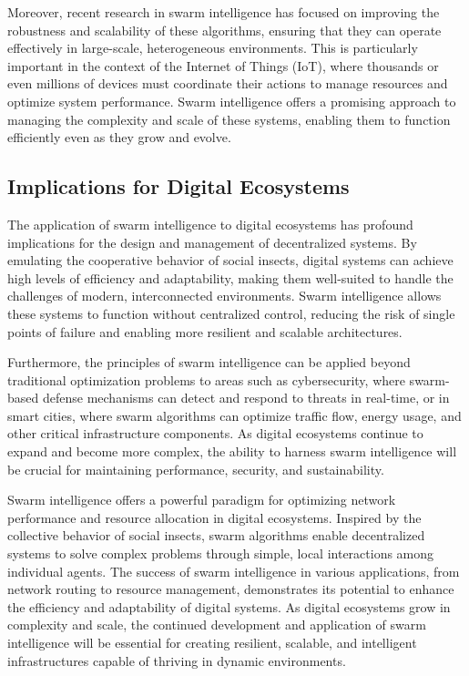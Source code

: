 \documentclass[12pt,twoside]{article}
\begin{document}
Moreover, recent research in swarm intelligence has focused on improving the robustness and scalability of these algorithms, ensuring that they can operate effectively in large-scale, heterogeneous environments. This is particularly important in the context of the Internet of Things (IoT), where thousands or even millions of devices must coordinate their actions to manage resources and optimize system performance. Swarm intelligence offers a promising approach to managing the complexity and scale of these systems, enabling them to function efficiently even as they grow and evolve.

\subsection{Implications for Digital Ecosystems}

The application of swarm intelligence to digital ecosystems has profound implications for the design and management of decentralized systems. By emulating the cooperative behavior of social insects, digital systems can achieve high levels of efficiency and adaptability, making them well-suited to handle the challenges of modern, interconnected environments. Swarm intelligence allows these systems to function without centralized control, reducing the risk of single points of failure and enabling more resilient and scalable architectures.

Furthermore, the principles of swarm intelligence can be applied beyond traditional optimization problems to areas such as cybersecurity, where swarm-based defense mechanisms can detect and respond to threats in real-time, or in smart cities, where swarm algorithms can optimize traffic flow, energy usage, and other critical infrastructure components. As digital ecosystems continue to expand and become more complex, the ability to harness swarm intelligence will be crucial for maintaining performance, security, and sustainability.

Swarm intelligence offers a powerful paradigm for optimizing network performance and resource allocation in digital ecosystems. Inspired by the collective behavior of social insects, swarm algorithms enable decentralized systems to solve complex problems through simple, local interactions among individual agents. The success of swarm intelligence in various applications, from network routing to resource management, demonstrates its potential to enhance the efficiency and adaptability of digital systems. As digital ecosystems grow in complexity and scale, the continued development and application of swarm intelligence will be essential for creating resilient, scalable, and intelligent infrastructures capable of thriving in dynamic environments.
\end{document}
